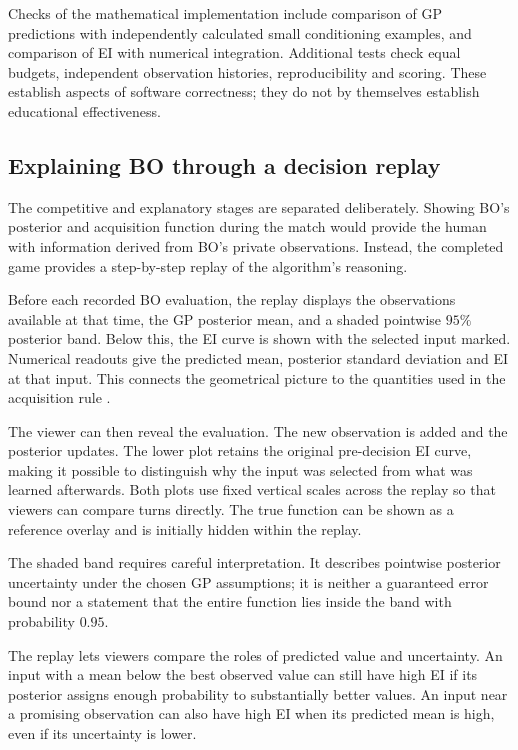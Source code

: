 Checks of the mathematical implementation include comparison of GP
predictions with independently calculated small conditioning examples,
and comparison of EI with numerical integration. Additional tests check
equal budgets, independent observation histories, reproducibility and
scoring. These establish aspects of software correctness; they do not
by themselves establish educational effectiveness.


\subsection{Explaining BO through a decision replay}
\label{subsec:demo-decisions}

The competitive and explanatory stages are separated deliberately.
Showing BO's posterior and acquisition function during the match would
provide the human with information derived from BO's private
observations. Instead, the completed game provides a step-by-step
replay of the algorithm's reasoning.

Before each recorded BO evaluation, the replay displays the observations
available at that time, the GP posterior mean, and a shaded pointwise
\(95\%\) posterior band. Below this, the EI curve is shown with the
selected input marked. Numerical readouts give the predicted mean,
posterior standard deviation and EI at that input. This connects the
geometrical picture to the quantities used in the acquisition rule
\cite{frazier2018tutorial}.

The viewer can then reveal the evaluation. The new observation is added
and the posterior updates. The lower plot retains the original
pre-decision EI curve, making it possible to distinguish why the input
was selected from what was learned afterwards. Both plots use fixed
vertical scales across the replay so that viewers can compare turns
directly. The true function can be shown as a reference overlay and is
initially hidden within the replay.

The shaded band requires careful interpretation. It describes pointwise
posterior uncertainty under the chosen GP assumptions; it is neither a
guaranteed error bound nor a statement that the entire function lies
inside the band with probability \(0.95\).

The replay lets viewers compare the roles of predicted value and
uncertainty. An input with a mean below the best observed value can
still have high EI if its posterior assigns enough probability to
substantially better values. An input near a promising observation can
also have high EI when its predicted mean is high, even if its
uncertainty is lower.

